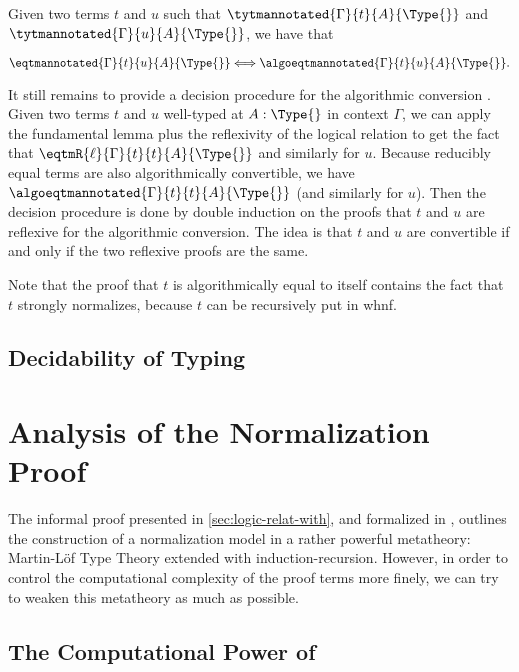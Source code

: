 \begin{theorem}
  \label{thm:algoconv}
    Given two terms $t$ and $u$ such that
    $\tytmannotated{\Gamma}{t}{A}{\Type{}}$ and
    $\tytmannotated{\Gamma}{u}{A}{\Type{}}$, we have that

    $$ \eqtmannotated{\Gamma}{t}{u}{A}{\Type{}} \Longleftrightarrow\algoeqtmannotated{\Gamma}{t}{u}{A}{\Type{}}.$$
\end{theorem}

It still remains to provide a decision procedure for the algorithmic
conversion .
%
Given two terms $t$ and $u$ well-typed at $A : \Type{}$ in context
$\Gamma$, we can apply the fundamental lemma plus the reflexivity of
the logical relation to get the fact that $\eqtmR{\ell}{\Gamma}{t}{t}{A}{\Type{}}$
and similarly for $u$.
%
Because reducibly equal terms are also algorithmically convertible, we
have $\algoeqtmannotated{\Gamma}{t}{t}{A}{\Type{}}$ (and similarly for $u$).
%
Then the decision procedure is done by double induction on the proofs
that $t$ and $u$ are reflexive for the algorithmic conversion.
%
The idea is that $t$ and $u$ are convertible if and only if the two reflexive proofs are the same.

Note that the proof that $t$ is algorithmically equal to itself
contains the fact that $t$ strongly normalizes, because
$t$ can be recursively put in whnf.

\subsection{Decidability of Typing}


\section{Analysis of the Normalization Proof}
\label{sec:analys-norm-proof}

The informal proof presented in \cref{sec:logic-relat-with}, and
formalized in \Agda, outlines the construction of a normalization
model in a rather powerful metatheory: Martin-Löf Type Theory extended
with induction-recursion.
%
However, in order to control the computational complexity of the proof terms
more finely, we can try to weaken this metatheory as much as possible.

\subsection{The Computational Power of \SetoidCC}

